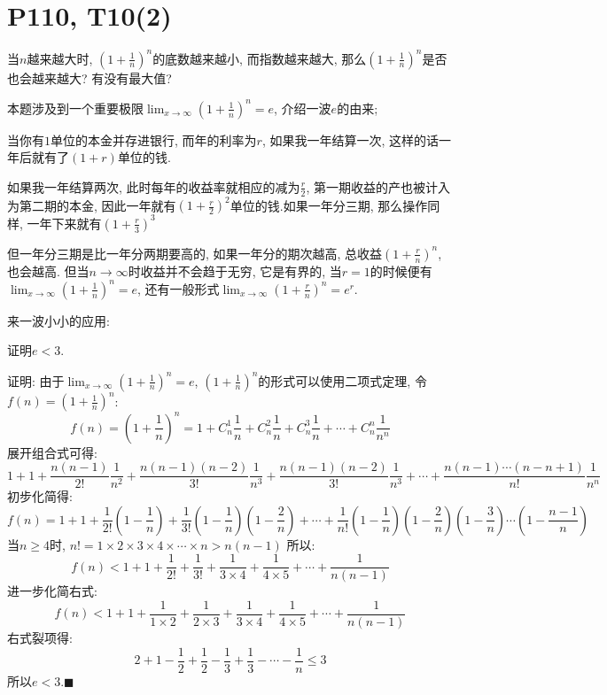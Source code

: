 \documentclass{book}
\begin{document}
    \section{\textcolor[rgb]{0.11,0.65,0.52}{P110, T10(2)}}
    \begin{boxB}
        当$n$越来越大时, $\displaystyle (1+\frac{1}{n})^{n}$的底数越来越小, 而指数越来越大, 那么$\displaystyle (1+\frac{1}{n})^{n}$是否也会越来越大? 有没有最大值?
    \end{boxB}
    本题涉及到一个重要极限$\displaystyle \lim_{x \to \infty} (1+\frac{1}{n} )^n=e$, 介绍一波$e$的由来;

    当你有$1$单位的本金并存进银行, 而年的利率为$r$, 如果我一年结算一次, 这样的话一年后就有了$(1+r)$单位的钱.

    如果我一年结算两次, 此时每年的收益率就相应的减为$\displaystyle \frac{r}{2}$, 第一期收益的产也被计入为第二期的本金, 因此一年就有$\displaystyle (1+\frac{r}{2})^2$单位的钱.如果一年分三期, 那么操作同样, 一年下来就有$\displaystyle (1+\frac{r}{3})^3$

    但一年分三期是比一年分两期要高的, 如果一年分的期次越高, 总收益$\displaystyle (1+\frac{r}{n})^n$, 也会越高. 但当$n\to \infty$时收益并不会趋于无穷, 它是有界的, 当$r=1$的时候便有$\displaystyle \lim_{x \to \infty} (1+\frac{1}{n} )^n=e$, 还有一般形式$\displaystyle \lim_{x \to \infty} (1+\frac{r}{n} )^n=e^r$.

    来一波小小的应用:
    \begin{boxB}
        证明$e<3$.
    \end{boxB}
    证明: 由于$\displaystyle \lim_{x \to \infty} (1+\frac{1}{n} )^n=e$, $\displaystyle (1+\frac{1}{n} )^n$的形式可以使用二项式定理, 令$\displaystyle f(n)=(1+\frac{1}{n} )^n$:
    $$
        f(n)=(1+\frac{1}{n})^n=1+C_n^1\frac{1}{n}+C_n^2\frac{1}{n}+C_n^3\frac{1}{n}+\cdots +C_n^n\frac{1}{n^n}
    $$
    展开组合式可得:
    $$
        1+1+\frac{n(n-1)}{2!}\frac{1}{n^2}+\frac{n(n-1)(n-2)}{3!}\frac{1}{n^3}+\frac{n(n-1)(n-2)}{3!}\frac{1}{n^3}+\cdots +\frac{n(n-1)\cdots (n-n+1)}{n!}\frac{1}{n^n}
    $$
    初步化简得:
    $$
        f(n)=1+1+\frac{1}{2!}(1-\frac{1}{n})+\frac{1}{3!}(1-\frac{1}{n})(1-\frac{2}{n})+\cdots +\frac{1}{n!}(1-\frac{1}{n})(1-\frac{2}{n})(1-\frac{3}{n})\cdots (1-\frac{n-1}{n})
    $$
    当$n\ge 4$时, $n!=1\times2\times3\times4\times\cdots \times n>n(n-1)$
    所以:
    $$
        f(n)<1+1+\frac{1}{2!}+\frac{1}{3!}+\frac{1}{3\times4}+\frac{1}{4\times5}+\cdots +\frac{1}{n(n-1)}
    $$
    进一步化简右式:
    $$
        f(n)<1+1+\frac{1}{1\times2}+\frac{1}{2\times3}+\frac{1}{3\times4}+\frac{1}{4\times5}+\cdots+\frac{1}{n(n-1)}
    $$
    右式裂项得:
    $$
        2+1-\frac{1}{2}+\frac{1}{2}-\frac{1}{3}+\frac{1}{3}-\cdots-\frac{1}{n} \le 3
    $$
    所以$e<3$.$\blacksquare$
\end{document}
